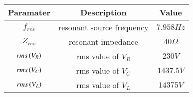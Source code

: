 \begin{tabular}{|c|c|c|}
\hline
\textbf{Paramater} & \textbf{Description} & \textbf{Value}  \\ \hline
$f_{res}$ & resonant source frequency & $7.958 Hz$\\\hline
$Z_{res}$ & resonant impedance & $40 \Omega$\\\hline
$rms\left(V_{R}\right)$ & rms value of $V_R$ & $230 V$\\\hline
$rms\left(V_{C}\right)$ & rms value of $V_C$ & $1437.5 V$\\\hline
$rms\left(V_{L}\right)$ & rms value of $V_L$ & $14375 V$\\\hline
\end{tabular}
